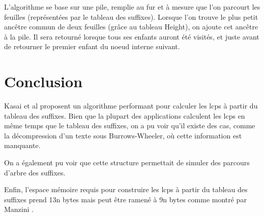 \documentclass[a4paper,11pt]{article}
\begin{document}
L'algorithme se base sur une pile, remplie au fur et à mesure que l'on
parcourt les feuilles (représentées par le tableau des
suffixes). Lorsque l'on trouve le plus petit ancêtre commun de deux
feuilles (grâce au tableau Height), on ajoute cet ancêtre à la
pile. Il sera retourné lorsque tous ses enfants auront été visités, et
juste avant de retourner le premier enfant du noeud interne suivant.




\section{Conclusion}
\label{sec:conclusion}


Kasai et al proposent un algorithme performant pour calculer les lcps
à partir du tableau des suffixes. Bien que la plupart des applications
calculent les lcps en même temps que le tableau des suffixes, on a pu
voir qu'il existe des cas, comme la décompression d'un texte sous
Burrows-Wheeler, où cette information est manquante.

On a également pu voir que cette structure permettait de simuler des
parcours d'arbre des suffixes.

Enfin, l'espace mémoire requis pour construire les lcps à partir du
tableau des suffixes prend 13n bytes mais peut être ramené à 9n bytes
comme montré par Manzini \cite{Manzini04}.




\end{document}
